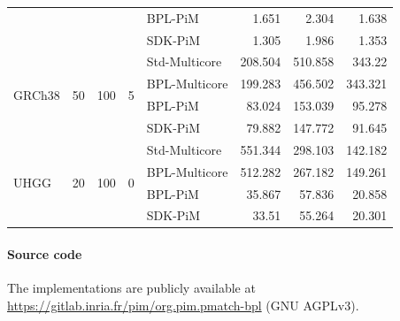 \begin{table}
\begin{tabular}{lllllrrr}
\arrayrulecolor{lightgray}\cmidrule{5-8}\arrayrulecolor{black}
&&&& BPL-PiM & 1.651 & 2.304 & 1.638 \\
&&&& SDK-PiM & 1.305 & 1.986 & 1.353 \\
\midrule
\multirow{4}{*}{GRCh38} & \multirow{4}{*}{50} & \multirow{4}{*}{100} & \multirow{4}{*}{5} & Std-Multicore & 208.504 & 510.858 & 343.22 \\
&&&& BPL-Multicore & 199.283 & 456.502 & 343.321 \\
\arrayrulecolor{lightgray}\cmidrule{5-8}\arrayrulecolor{black}
&&&& BPL-PiM & 83.024 & 153.039 & 95.278 \\
&&&& SDK-PiM & 79.882 & 147.772 & 91.645 \\
\midrule
\multirow{4}{*}{UHGG} & \multirow{4}{*}{20} & \multirow{4}{*}{100} & \multirow{4}{*}{0} & Std-Multicore & 551.344 & 298.103 & 142.182 \\
&&&& BPL-Multicore & 512.282 & 267.182 & 149.261 \\
\arrayrulecolor{lightgray}\cmidrule{5-8}\arrayrulecolor{black}
&&&& BPL-PiM & 35.867 & 57.836 & 20.858 \\
&&&& SDK-PiM & 33.51 & 55.264 & 20.301 \\

\bottomrule
    \end{tabular}
\end{table}

\paragraph{Source code} The implementations are publicly available at \url{https://gitlab.inria.fr/pim/org.pim.pmatch-bpl} (GNU AGPLv3).